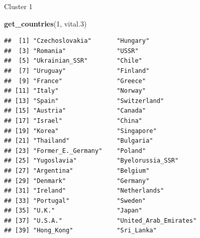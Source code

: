 \documentclass[
  ignorenonframetext,
]{beamer}
\newenvironment{Shaded}{\begin{snugshade}}{\end{snugshade}}
\newcommand{\DecValTok}[1]{\textcolor[rgb]{0.00,0.00,0.81}{#1}}
\newcommand{\FloatTok}[1]{\textcolor[rgb]{0.00,0.00,0.81}{#1}}
\newcommand{\KeywordTok}[1]{\textcolor[rgb]{0.13,0.29,0.53}{\textbf{#1}}}
\newcommand{\NormalTok}[1]{#1}
\begin{document}
\begin{frame}[fragile]{Cluster 1}
\protect\hypertarget{cluster-1}{}

\begin{Shaded}
\begin{Highlighting}[]
\KeywordTok{get_countries}\NormalTok{(}\DecValTok{1}\NormalTok{, vital}\FloatTok{.3}\NormalTok{)}
\end{Highlighting}
\end{Shaded}

\begin{verbatim}
##  [1] "Czechoslovakia"       "Hungary"             
##  [3] "Romania"              "USSR"                
##  [5] "Ukrainian_SSR"        "Chile"               
##  [7] "Uruguay"              "Finland"             
##  [9] "France"               "Greece"              
## [11] "Italy"                "Norway"              
## [13] "Spain"                "Switzerland"         
## [15] "Austria"              "Canada"              
## [17] "Israel"               "China"               
## [19] "Korea"                "Singapore"           
## [21] "Thailand"             "Bulgaria"            
## [23] "Former_E._Germany"    "Poland"              
## [25] "Yugoslavia"           "Byelorussia_SSR"     
## [27] "Argentina"            "Belgium"             
## [29] "Denmark"              "Germany"             
## [31] "Ireland"              "Netherlands"         
## [33] "Portugal"             "Sweden"              
## [35] "U.K."                 "Japan"               
## [37] "U.S.A."               "United_Arab_Emirates"
## [39] "Hong_Kong"            "Sri_Lanka"
\end{verbatim}

\end{frame}
\end{document}
